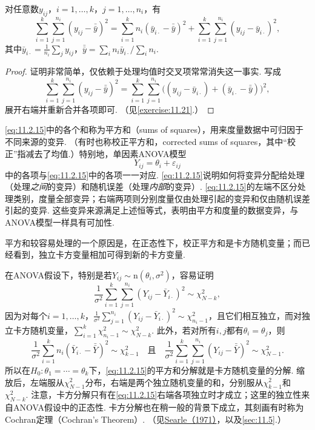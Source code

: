 \begin{theorem}\label{thm:11.2.11}
对任意数$y_{ij}$，$i=1,\ldots,k$，$j=1,\ldots,n_i$，有
\begin{equation}\label{eq:11.2.15}
\sum_{i=1}^k\sum_{j=1}^{n_i}(y_{ij}-\bar{\bar y})^2
=\sum_{i=1}^kn_i(\bar y_{i\cdot}-\bar{\bar y})^2
+\sum_{i=1}^k\sum_{j=1}^{n_i}(y_{ij}-\bar y_{i\cdot})^2,
\end{equation}
其中$\bar y_{i\cdot}=\frac1{n_i}\sum_jy_{ij}$，$\bar{\bar y}=\sum_i n_i\bar y_{i\cdot}/\sum_i n_i$.
\end{theorem}
\begin{proof}
证明非常简单，仅依赖于处理均值时交叉项常常消失这一事实. 写成
$$\sum_{i=1}^k\sum_{j=1}^{n_i}(y_{ij}-\bar{\bar y})^2
=\sum_{i=1}^k\sum_{j=1}^{n_i}\bigl((y_{ij}-\bar y_{i\cdot})+(\bar y_{i\cdot}-\bar{\bar y})\bigr)^2,$$
展开右端并重新合并各项即可. （见\autoref{exercise:11.21}.）
\end{proof}

\eqref{eq:11.2.15}中的各个和称为平方和（sums of squares），用来度量数据中可归因于不同来源的变异. （有时也称校正平方和，corrected sums of squares，其中“校正”指减去了均值.）特别地，单因素ANOVA模型
$$Y_{ij}=\theta_i+\varepsilon_{ij}$$
中的各项与\eqref{eq:11.2.15}中的各项一一对应. \eqref{eq:11.2.15}说明如何将变异分配给处理（处理\emph{之间}的变异）和随机误差（处理\emph{内部}的变异）. \eqref{eq:11.2.15}的左端不区分处理类别，度量全部变异；右端两项则分别度量仅由处理引起的变异和仅由随机误差引起的变异. 这些变异来源满足上述恒等式，表明由平方和度量的数据变异，与ANOVA模型一样具有可加性.

平方和较容易处理的一个原因是，在正态性下，校正平方和是卡方随机变量；而已经看到，独立卡方变量相加可得到新的卡方变量.

在ANOVA假设下，特别是若$Y_{ij}\sim\mathrm n(\theta_i,\sigma^2)$，容易证明
\begin{equation}\label{eq:11.2.16}
\frac1{\sigma^2}\sum_{i=1}^k\sum_{j=1}^{n_i}(Y_{ij}-\bar Y_{i\cdot})^2\sim\chi^2_{N-k},
\end{equation}
因为对每个$i=1,\ldots,k$，$\frac1{\sigma^2}\sum_{j=1}^{n_i}(Y_{ij}-\bar Y_{i\cdot})^2\sim\chi^2_{n_i-1}$，且它们相互独立，而对独立卡方随机变量，$\sum_{i=1}^k\chi^2_{n_i-1}\sim\chi^2_{N-k}$. 此外，若对所有$i,j$都有$\theta_i=\theta_j$，则
\begin{equation}\label{eq:11.2.17}
\frac1{\sigma^2}\sum_{i=1}^kn_i(\bar Y_{i\cdot}-\bar{\bar Y})^2\sim\chi^2_{k-1}
\quad\text{且}\quad
\frac1{\sigma^2}\sum_{i=1}^k\sum_{j=1}^{n_i}(Y_{ij}-\bar{\bar Y})^2\sim\chi^2_{N-1}.
\end{equation}
所以在$H_0:\theta_1=\cdots=\theta_k$下，\eqref{eq:11.2.15}的平方和分解就是卡方随机变量的分解. 缩放后，左端服从$\chi^2_{N-1}$分布，右端是两个独立随机变量的和，分别服从$\chi^2_{k-1}$和$\chi^2_{N-k}$. 注意，卡方分解只有在\eqref{eq:11.2.15}右端各项独立时才成立；这里的独立性来自ANOVA假设中的正态性. 卡方分解也在稍一般的背景下成立，其刻画有时称为Cochran定理（Cochran's Theorem）. （见\hyperref[bib:source282]{Searle（1971）}，以及\autoref{sec:11.5}.）

